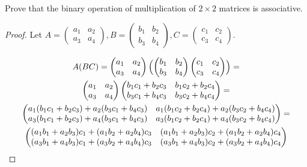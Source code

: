 \documentclass{article}
\begin{document}
Prove that the binary operation of multiplication of $2 \times 2$ matrices is associative.

\begin{proof}
    Let $A = \begin{pmatrix}a_1 & a_2\\a_3 & a_4\end{pmatrix}, B = \begin{pmatrix}b_1 & b_2\\b_3 & b_4\end{pmatrix}, C = \begin{pmatrix}c_1 & c_2\\c_3 & c_4\end{pmatrix}$.

    \begin{multline*}
        A(BC) = \begin{pmatrix}a_1 & a_2\\a_3 & a_4\end{pmatrix}\Bigl(\begin{pmatrix}b_1 & b_2\\b_3 & b_4\end{pmatrix}\begin{pmatrix}c_1 & c_2\\c_3 & c_4\end{pmatrix}\Bigr) = \\
        \begin{pmatrix}a_1 & a_2\\a_3 & a_4\end{pmatrix}\begin{pmatrix}b_1 c_1 + b_2 c_3 & b_1 c_2 + b_2 c_4\\b_3 c_1 + b_4 c_3 & b_3 c_2 + b_4 c_4\end{pmatrix} = \\
        \begin{pmatrix}
            a_1 (b_1 c_1 + b_2 c_3) + a_2 (b_3 c_1 + b_4 c_3) & a_1 (b_1 c_2 + b_2 c_4) + a_2 (b_3 c_2 + b_4 c_4)\\
            a_3 (b_1 c_1 + b_2 c_3) + a_4 (b_3 c_1 + b_4 c_3) & a_3 (b_1 c_2 + b_2 c_4) + a_4 (b_3 c_2 + b_4 c_4)
        \end{pmatrix} = \\
        \begin{pmatrix}
            (a_1 b_1 + a_2 b_3) c_1 + (a_1 b_2 + a_2 b_4) c_3 & (a_1 b_1 + a_2 b_3) c_2 + (a_1 b_2 + a_2 b_4) c_4\\
            (a_3 b_1 + a_4 b_3) c_1 + (a_3 b_2 + a_4 b_4) c_3 & (a_3 b_1 + a_4 b_3) c_2 + (a_3 b_2 + a_4 b_4) c_4

\end{pmatrix}
\end{multline*}
\end{proof}
\end{document}
